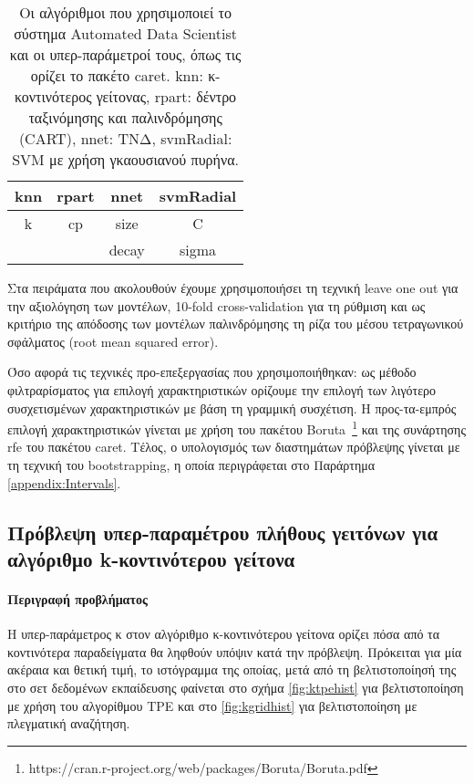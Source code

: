 	\begin{table}[!htb]
		\begin{center}
				\caption[Οι αλγόριθμοι που χρησιμοποιεί το σύστημα Automated Data Scientist και οι υπερ-παράμετροί του]{Οι αλγόριθμοι που χρησιμοποιεί το σύστημα Automated Data Scientist και οι υπερ-παράμετροί τους, όπως τις ορίζει το πακέτο caret. knn: κ-κοντινότερος γείτονας, rpart: δέντρο ταξινόμησης και παλινδρόμησης (CART), nnet: \gls{ΤΝΔ}, svmRadial: \gls{SVM} με χρήση γκαουσιανού πυρήνα.}
				\label{table:algorithms}
			\begin{tabular}{ |c|c|c|c| } 
				\hline
				knn & rpart & nnet & svmRadial \\
				\hline
			    k & cp & size& C \\
			     &  & decay& sigma  \\
				\hline
			\end{tabular}    
		\end{center}
	\end{table} 
	
Στα πειράματα που ακολουθούν έχουμε χρησιμοποιήσει τη τεχνική leave one out για την αξιολόγηση των μοντέλων, 10-fold cross-validation για τη ρύθμιση και ως κριτήριο της απόδοσης των μοντέλων παλινδρόμησης τη ρίζα του μέσου τετραγωνικού σφάλματος (root mean squared error).

Όσο αφορά τις τεχνικές προ-επεξεργασίας που χρησιμοποιήθηκαν: ως μέθοδο φιλτραρίσματος για επιλογή χαρακτηριστικών ορίζουμε την επιλογή των λιγότερο συσχετισμένων χαρακτηριστικών με βάση τη γραμμική συσχέτιση. Η προς-τα-εμπρός επιλογή χαρακτηριστικών γίνεται με χρήση του πακέτου Boruta~\footnote{https://cran.r-project.org/web/packages/Boruta/Boruta.pdf} και της συνάρτησης rfe του πακέτου caret. Τέλος, ο υπολογισμός των διαστημάτων πρόβλεψης γίνεται με τη τεχνική του bootstrapping, η οποία περιγράφεται στο Παράρτημα \ref{appendix:Intervals}.
 
\subsection{Πρόβλεψη υπερ-παραμέτρου πλήθους γειτόνων για αλγόριθμο k-κοντι\-νότερου γείτονα}

\paragraph{Περιγραφή προβλήματος} Η υπερ-παράμετρος κ στον αλγόριθμο κ-κοντινότερου γείτονα ορίζει πόσα από τα κοντινότερα παραδείγματα θα ληφθούν υπόψιν κατά την πρόβλεψη. Πρόκειται για μία ακέραια και θετική τιμή, το ιστόγραμμα της οποίας, μετά από τη βελτιστοποίησή της στο σετ δεδομένων εκπαίδευσης φαίνεται στο σχήμα  \ref{fig:ktpehist} για βελτιστοποίηση με χρήση του αλγορίθμου \gls{TPE} και στο \ref{fig:kgridhist} για βελτιστοποίηση με πλεγματική αναζήτηση.

